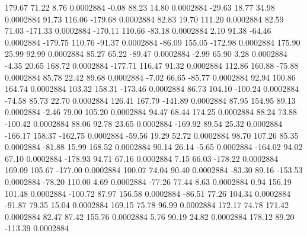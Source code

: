       179.67       71.22        8.76     0.0002884
       -0.08       88.23       14.80     0.0002884
      -29.63       18.77       34.98     0.0002884
       91.73      116.06     -179.68     0.0002884
       82.83       19.70      111.20     0.0002884
       82.59       71.03     -171.33     0.0002884
     -170.11      110.66      -83.18     0.0002884
        2.10       91.38      -64.46     0.0002884
     -179.75      110.76      -91.37     0.0002884
      -86.09      155.05     -172.98     0.0002884
      175.90       25.99       92.99     0.0002884
       85.27       65.22      -89.47     0.0002884
       -2.99       65.90        3.28     0.0002884
       -4.35       20.65      168.72     0.0002884
     -177.71      116.47       91.32     0.0002884
      112.86      160.88      -75.88     0.0002884
       85.78       22.42       89.68     0.0002884
       -7.02       66.65      -85.77     0.0002884
       92.94      100.86      164.74     0.0002884
      103.32      158.31     -173.46     0.0002884
       86.73      104.10     -100.24     0.0002884
      -74.58       85.73       22.70     0.0002884
      126.41      167.79     -141.89     0.0002884
       87.95      154.95       89.13     0.0002884
       -2.46       79.00      105.20     0.0002884
       94.47       68.44      174.25     0.0002884
       88.24       73.88     -100.42     0.0002884
       88.06       92.78       23.65     0.0002884
     -169.92       89.54       25.32     0.0002884
     -166.17      158.37     -162.75     0.0002884
      -59.56       19.29       52.72     0.0002884
       98.70      107.26       85.35     0.0002884
      -81.88       15.99      168.52     0.0002884
       90.14       26.14       -5.65     0.0002884
     -164.02       94.02       67.10     0.0002884
     -178.93       94.71       67.16     0.0002884
        7.15       66.03     -178.22     0.0002884
      169.09      105.67     -177.00     0.0002884
      100.07       74.04       90.40     0.0002884
      -83.30       89.16     -153.53     0.0002884
      -78.20      110.00        4.69     0.0002884
      -77.26       77.44        8.63     0.0002884
        0.94      156.19      101.48     0.0002884
     -100.72       87.97      156.58     0.0002884
      -86.51       77.26      104.34     0.0002884
      -91.87       79.35       15.04     0.0002884
      169.15       75.78       96.99     0.0002884
      172.17       74.78      171.42     0.0002884
       82.47       87.42      155.76     0.0002884
        5.76       90.19       24.82     0.0002884
      178.12       89.20     -113.39     0.0002884
